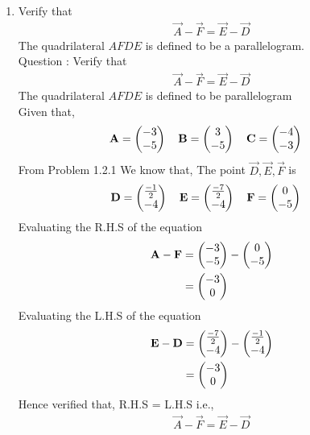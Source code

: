 \documentclass[11pt]{book}
\begin{document}
\begin{enumerate}[label=\thesection.\arabic*.,ref=\thesection.\theenumi]
\item Verify that 
		\begin{align}
\vec{A}-\vec{F}=\vec{E}-\vec{D}
		\end{align}
The quadrilateral $AFDE$ is defined to be a parallelogram.\\
Question : Verify that 
\begin{align}
	\vec{A}-\vec{F} = \vec{E}-\vec{D}
\end{align}
The quadrilateral $AFDE$ is defined to be parallelogram
\\ \solution 
Given that,
\begin{align}
    \mathbf{A} = \begin{pmatrix}-3\\-5\end{pmatrix}
    \quad
    \mathbf{B} &= \begin{pmatrix}3\\-5\end{pmatrix}
    \quad
    \mathbf{C} = \begin{pmatrix}-4\\-3\end{pmatrix}
\end{align}
From Problem 1.2.1 We know that, The point $\vec{D},\vec{E},\vec{F}$ is 
\begin{align}
    \mathbf{D} = \begin{pmatrix}\frac{-1}{2}\\ -4 \end{pmatrix}
    \quad
    \mathbf{E} &= \begin{pmatrix}\frac{-7}{2}\\-4\end{pmatrix}
    \quad
    \mathbf{F} = \begin{pmatrix}0\\ -5\end{pmatrix}
\end{align}
Evaluating the R.H.S of the equation
\begin{align}
    \mathbf{A}-\mathbf{F}&=\begin{pmatrix}-3\\-5\end{pmatrix}-\begin{pmatrix}0\\ -5 \end{pmatrix}\\
    &=\begin{pmatrix} -3 \\ 0 \end{pmatrix}
\end{align} 
Evaluating the L.H.S of the equation
\begin{align}
    \mathbf{E}-\mathbf{D}&=\begin{pmatrix}\frac{-7}{2}\\-4\end{pmatrix}-\begin{pmatrix}\frac{-1}{2}\\ -4 \end{pmatrix}\\
    &=\begin{pmatrix}-3 \\ 0 \end{pmatrix}
\end{align}
Hence verified that, R.H.S = L.H.S i.e.,
\begin{align}
	\vec{A}-\vec{F} = \vec{E}-\vec{D}
\end{align}


\end{enumerate}
\end{document}

